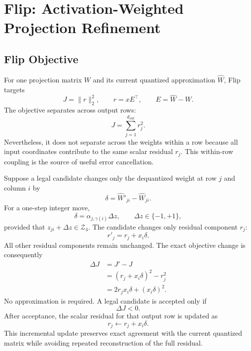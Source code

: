 \section{Flip: Activation-Weighted Projection Refinement}

\subsection{Flip Objective}

For one projection matrix $W$ and its current quantized approximation $\hat W$, Flip targets
\begin{equation}
J=\|r\|_2^2,
\qquad
r=xE^\top,
\qquad
E=\hat W-W.
\end{equation}
The objective separates across output rows:
\begin{equation}
J=\sum_{j=1}^{d_{\mathrm{out}}}r_j^2.
\end{equation}
Nevertheless, it does not separate across the weights within a row because all input coordinates contribute to the same scalar residual $r_j$. This within-row coupling is the source of useful error cancellation.

Suppose a legal candidate changes only the dequantized weight at row $j$ and column $i$ by
\begin{equation}
\delta=\hat W'_{ji}-\hat W_{ji}.
\end{equation}
For a one-step integer move,
\begin{equation}
\delta=\alpha_{j,\gamma(i)}\Delta z,
\qquad
\Delta z\in\{-1,+1\},
\end{equation}
provided that $z_{ji}+\Delta z\in\mathcal{Z}_4$. The candidate changes only residual component $r_j$:
\begin{equation}
r'_j=r_j+x_i\delta.
\end{equation}
All other residual components remain unchanged. The exact objective change is consequently
\begin{align}
\Delta J
&=J'-J \\
&=(r_j+x_i\delta)^2-r_j^2 \\
&=2r_jx_i\delta+(x_i\delta)^2.
\end{align}
No approximation is required. A legal candidate is accepted only if
\begin{equation}
\Delta J<0.
\end{equation}
After acceptance, the scalar residual for that output row is updated as
\begin{equation}
r_j\leftarrow r_j+x_i\delta.
\end{equation}
This incremental update preserves exact agreement with the current quantized matrix while avoiding repeated reconstruction of the full residual.

